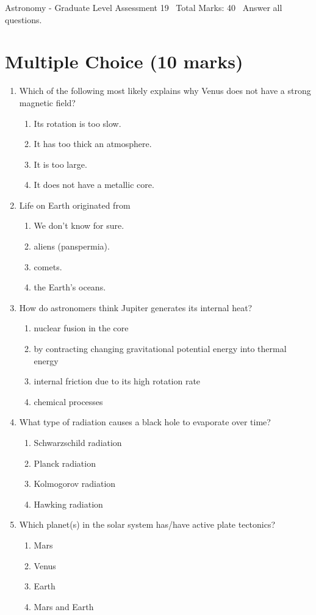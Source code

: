 \documentclass[12pt]{article}
\begin{document}
\begin{center}
Astronomy - Graduate Level Assessment 19 \
Total Marks: 40 \
Answer all questions.
\end{center}

\section*{Multiple Choice (10 marks)}
\begin{enumerate}[label=\arabic*.]
\item Which of the following most likely explains why Venus does not have a strong magnetic field?
\begin{enumerate}[label=(\alph*)]
    \item Its rotation is too slow.
    \item It has too thick an atmosphere.
    \item It is too large.
    \item It does not have a metallic core.
\end{enumerate}
\item Life on Earth originated from
\begin{enumerate}[label=(\alph*)]
    \item We don't know for sure.
    \item aliens (panspermia).
    \item comets.
    \item the Earth's oceans.
\end{enumerate}
\item How do astronomers think Jupiter generates its internal heat?
\begin{enumerate}[label=(\alph*)]
    \item nuclear fusion in the core
    \item by contracting changing gravitational potential energy into thermal energy
    \item internal friction due to its high rotation rate
    \item chemical processes
\end{enumerate}
\item What type of radiation causes a black hole to evaporate over time?
\begin{enumerate}[label=(\alph*)]
    \item Schwarzschild radiation
    \item Planck radiation
    \item Kolmogorov radiation
    \item Hawking radiation
\end{enumerate}
\item Which planet(s) in the solar system has/have active plate tectonics?
\begin{enumerate}[label=(\alph*)]
    \item Mars
    \item Venus
    \item Earth
    \item Mars and Earth
\end{enumerate}
\end{enumerate}
\end{document}
